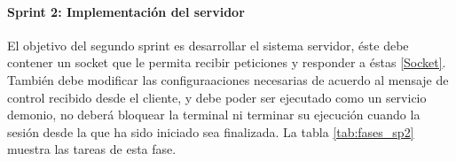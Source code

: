 \documentclass[12pt]{article}
\begin{document}
            \begin{table}[!htbp]             
                \centering                  
                \caption{Descripción del sprint 1}
                \label{tab:fases_sp1}
            \end{table}

            \paragraph{ Sprint 2: Implementación del servidor}
            El objetivo del segundo sprint es desarrollar el sistema servidor, éste debe contener un socket que le permita recibir peticiones y responder a éstas \ref{Socket}. También debe modificar las configuraaciones necesarias de acuerdo al mensaje de control recibido desde el cliente, y debe poder ser ejecutado como un servicio demonio, no deberá bloquear la terminal ni terminar su ejecución cuando la sesión desde la que ha sido iniciado sea finalizada. La tabla \ref{tab:fases_sp2} muestra las tareas de esta fase.
\end{document}
